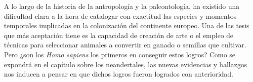 \documentclass[12pt, a4paper, oneside]{report}
\begin{document}
	A lo largo de la historia de la antropología y la paleontología, ha existido una dificultad clara a la
    hora de catalogar con exactitud las especies y momentos temporales implicadas en la colonización del
    continente europeo. Una de las tesis que más aceptación tiene es la capacidad de creación de arte o
    el empleo de técnicas para seleccionar animales a convertir en ganado o semillas que cultivar. Pero
    ¿son los \emph{Homo sapiens} los primeros en conseguir estos logros? Como se expondrá en el capítulo sobre
    los neandertales, las nuevas evidencias y hallazgos nos inducen a pensar en que dichos logros fueron
    logrados con anterioridad.
\end{document}
